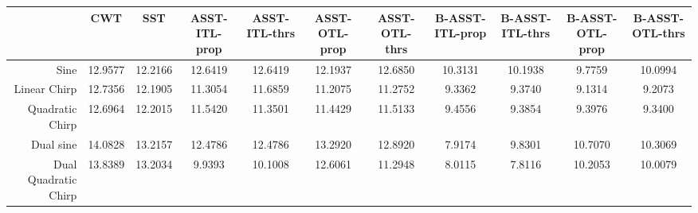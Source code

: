 \begin{tabular}{|r|c|c|c|c|c|c|c|c|c|c|}
\toprule
 & CWT & SST & ASST-ITL-prop & ASST-ITL-thrs & ASST-OTL-prop & ASST-OTL-thrs & B-ASST-ITL-prop & B-ASST-ITL-thrs & B-ASST-OTL-prop & B-ASST-OTL-thrs \\
\midrule
Sine & 12.9577 & 12.2166 & 12.6419 & 12.6419 & 12.1937 & 12.6850 & 10.3131 & 10.1938 & 9.7759 & 10.0994 \\
Linear Chirp & 12.7356 & 12.1905 & 11.3054 & 11.6859 & 11.2075 & 11.2752 & 9.3362 & 9.3740 & 9.1314 & 9.2073 \\
Quadratic Chirp & 12.6964 & 12.2015 & 11.5420 & 11.3501 & 11.4429 & 11.5133 & 9.4556 & 9.3854 & 9.3976 & 9.3400 \\
Dual sine & 14.0828 & 13.2157 & 12.4786 & 12.4786 & 13.2920 & 12.8920 & 7.9174 & 9.8301 & 10.7070 & 10.3069 \\
Dual Quadratic Chirp & 13.8389 & 13.2034 & 9.9393 & 10.1008 & 12.6061 & 11.2948 & 8.0115 & 7.8116 & 10.2053 & 10.0079 \\
\bottomrule
\end{tabular}
